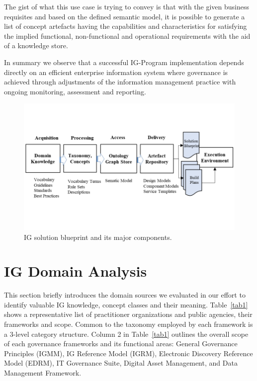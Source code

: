 \documentclass[runningheads]{llncs}
\begin{document}
The gist of what this use case is trying to convey is that with the given business requisites and based on the defined semantic model, it is possible to generate a list of concept artefacts having the capabilities and characteristics for satisfying the implied functional, non-functional and operational requirements with the aid of a knowledge store. 

In summary we observe that a successful IG-Program implementation depends directly on an efficient enterprise information system where governance is achieved through adjustments of the information management practice with ongoing monitoring, assessment and reporting. 
%
\begin{figure} [h]
 \centering
\includegraphics[page=4, width=.8\textwidth]{figs/IGSModelsLarge.pdf}
\vspace{-10pt}
\caption{IG solution blueprint and its major components.} \label{fig4}
\end{figure} %
%
\section{IG Domain Analysis}
This section briefly introduces the domain sources we evaluated in our effort to identify valuable IG knowledge, concept classes and their meaning. 
Table~\ref{tab1} shows a representative list of practitioner organizations and public agencies, their frameworks and scope. Common to the taxonomy employed by each framework is a 3-level category structure. Column 2 in Table~\ref{tab1} outlines the overall scope of each governance frameworks and its functional areas: General Governance Principles (IGMM), IG Reference Model (IGRM), Electronic Discovery Reference Model (EDRM), IT Governance Suite, Digital Asset Management, and Data Management Framework.
\end{document}
